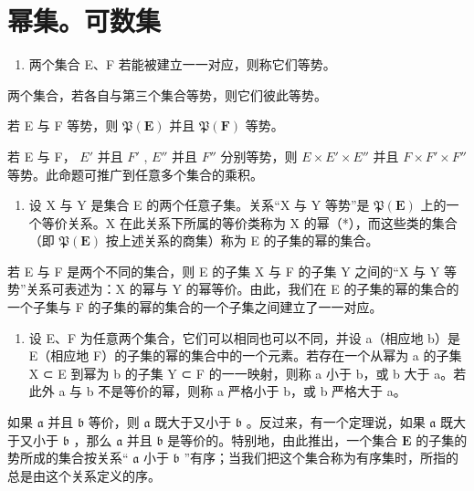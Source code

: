 \section{幂集。可数集}

\begin{enumerate}
\def\labelenumi{\arabic{enumi}.}
\tightlist
\item
  两个集合 E、F 若能被建立一一对应，则称它们等势。
\end{enumerate}

两个集合，若各自与第三个集合等势，则它们彼此等势。

若 E 与 F 等势，则 \(\mathfrak{P}(\mathbf{E})\) 并且 \(\mathfrak{P}(\mathbf{F})\) 等势。

若 E 与 F， \(E'\) 并且 \(F'\) , \(E''\) 并且 \(F''\) 分别等势，则 \(E \times E' \times E''\) 并且 \(F \times F' \times F''\) 等势。此命题可推广到任意多个集合的乘积。

\begin{enumerate}
\def\labelenumi{\arabic{enumi}.}
\setcounter{enumi}{1}
\tightlist
\item
  设 X 与 Y 是集合 E 的两个任意子集。关系“X 与 Y 等势”是 \(\mathfrak{P}(\mathbf{E})\) 上的一个等价关系。X 在此关系下所属的等价类称为 X 的幂（*），而这些类的集合（即 \(\mathfrak{P}(\mathbf{E})\) 按上述关系的商集）称为 E 的子集的幂的集合。
\end{enumerate}

若 E 与 F 是两个不同的集合，则 E 的子集 X 与 F 的子集 Y 之间的“X 与 Y 等势”关系可表述为：X 的幂与 Y 的幂等价。由此，我们在 E 的子集的幂的集合的一个子集与 F 的子集的幂的集合的一个子集之间建立了一一对应。

\begin{enumerate}
\def\labelenumi{\arabic{enumi}.}
\setcounter{enumi}{2}
\tightlist
\item
  设 E、F 为任意两个集合，它们可以相同也可以不同，并设 a（相应地 b）是 E（相应地 F）的子集的幂的集合中的一个元素。若存在一个从幂为 a 的子集 X ⊂ E 到幂为 b 的子集 Y ⊂ F 的一一映射，则称 a 小于 b，或 b 大于 a。若此外 a 与 b 不是等价的幂，则称 a 严格小于 b，或 b 严格大于 a。
\end{enumerate}

如果 \(\mathfrak{a}\) 并且 \(\mathfrak{b}\) 等价，则 \(\mathfrak{a}\) 既大于又小于 \(\mathfrak{b}\) 。反过来，有一个定理说，如果 \(\mathfrak{a}\) 既大于又小于 \(\mathfrak{b}\) ，那么 \(\mathfrak{a}\) 并且 \(\mathfrak{b}\) 是等价的。特别地，由此推出，一个集合 \(\mathbf{E}\) 的子集的势所成的集合按关系“ \(\mathfrak{a}\) 小于 \(\mathfrak{b}\) ”有序；当我们把这个集合称为有序集时，所指的总是由这个关系定义的序。

